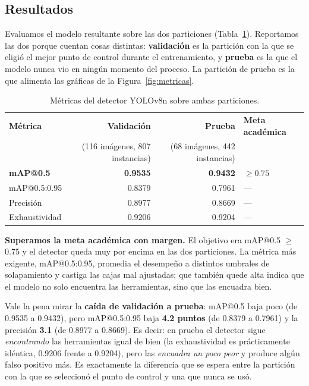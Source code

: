 \documentclass[11pt,a4paper]{article}
\begin{document}
\subsection{Resultados}

Evaluamos el modelo resultante sobre las dos particiones (Tabla~\ref{tab:deteccion}). Reportamos
las dos porque cuentan cosas distintas: \textbf{validación} es la partición con la que se eligió el
mejor punto de control durante el entrenamiento, y \textbf{prueba} es la que el modelo nunca vio en
ningún momento del proceso. La partición de prueba es la que alimenta las gráficas de la
Figura~\ref{fig:metricas}.

\begin{table}[htbp]
\centering
\caption{Métricas del detector YOLOv8n sobre ambas particiones.}
\label{tab:deteccion}
\small
\begin{tabular}{@{}lrrl@{}}
\toprule
\textbf{Métrica} & \textbf{Validación} & \textbf{Prueba} & \textbf{Meta académica} \\
 & \small{(116 imágenes, 807 instancias)} & \small{(68 imágenes, 442 instancias)} & \\
\midrule
\textbf{mAP@0.5} & \textbf{0.9535} & \textbf{0.9432} & $\geq 0.75$ \\
mAP@0.5:0.95     & 0.8379 & 0.7961 & --- \\
Precisión        & 0.8977 & 0.8669 & --- \\
Exhaustividad    & 0.9206 & 0.9204 & --- \\
\bottomrule
\end{tabular}
\end{table}

\textbf{Superamos la meta académica con margen.} El objetivo era mAP@0.5 $\geq$ 0.75 y el detector
queda muy por encima en las dos particiones. La métrica más exigente, mAP@0.5:0.95, promedia el
desempeño a distintos umbrales de solapamiento y castiga las cajas mal ajustadas; que también quede
alta indica que el modelo no solo encuentra las herramientas, sino que las encuadra bien.

Vale la pena mirar la \textbf{caída de validación a prueba}: mAP@0.5 baja poco (de 0.9535 a
0.9432), pero mAP@0.5:0.95 baja \textbf{4.2 puntos} (de 0.8379 a 0.7961) y la precisión
\textbf{3.1} (de 0.8977 a 0.8669). Es decir: en prueba el detector sigue \emph{encontrando} las
herramientas igual de bien (la exhaustividad es prácticamente idéntica, 0.9206 frente a 0.9204),
pero las \emph{encuadra un poco peor} y produce algún falso positivo más. Es exactamente la
diferencia que se espera entre la partición con la que se seleccionó el punto de control y una que
nunca se usó.
\end{document}

